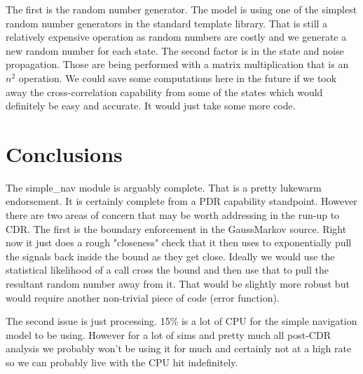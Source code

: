 \documentclass[]{LASPreport}
\begin{document}
The first is the random number generator.  The model is using 
one of the simplest random number generators in the standard template library.  
That is still a relatively expensive operation as random numbers are costly and 
we generate a new random number for each state.  The second factor is in the 
state and noise propagation.  Those are being performed with a matrix 
multiplication that is an $n^2$ operation.  We could save some computations 
here in the future if we took away the cross-correlation capability from some 
of the states which would definitely be easy and accurate.  It would just take 
some more code.

\section{Conclusions}
The simple\_nav module is arguably complete.  That is a pretty lukewarm 
endorsement.  It is certainly complete from a PDR capability standpoint.  
However there are two areas of concern that may be worth addressing in the 
run-up to CDR.  The first is the boundary enforcement in the GaussMarkov 
source.  Right now it just does a rough "closeness" check that it then uses 
to exponentially pull the signals back inside the bound as they get close.  
Ideally we would use the statistical likelihood of a call cross the bound and 
then use that to pull the resultant random number away from it.  That would be 
slightly more robust but would require another non-trivial piece of code 
(error function).

The second issue is just processing.  15\% is a lot of CPU for the simple 
navigation model to be using.  However for a lot of sims and pretty much all 
post-CDR analysis we probably won't be using it for much and certainly not at 
a high rate so we can probably live with the CPU hit indefinitely.
\end{document}
